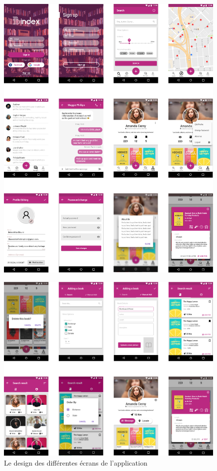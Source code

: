 \begin{figure}[H]
	\centering
		\includegraphics[width=14cm]{Images/chapter3/ui-design_1.png}
\end{figure}

\begin{figure}[H]
	\centering
		\includegraphics[width=14cm]{Images/chapter3/ui-design_2.png}
		\caption{{\footnotesize Le design des différentes écrans de l'application}}
\end{figure}